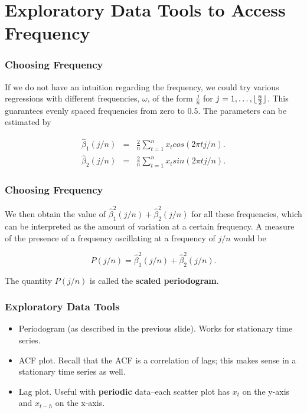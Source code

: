 \documentclass[%
xcolor=pdftex]{beamer}
\DeclarePairedDelimiter\floor{\lfloor}{\rfloor}
\begin{document}
\section{Exploratory Data Tools to Access Frequency}
\frame{\tableofcontents[currentsection]}

\begin{frame}
\frametitle{Choosing Frequency}

If we do not have an intuition regarding the frequency, we could try various regressions with different frequencies, $\omega$, of the form $\frac{j}{n}$ for $j=1,\ldots,\floor{\frac{n}{2}}$.  This guarantees evenly spaced frequencies from zero to 0.5. The parameters can be estimated by

\begin{eqnarray*}
\hat{\beta}_1(j/n) &=& \frac{2}{n} \sum_{t=1}^n x_t cos( 2 \pi t j/n ).\\
\hat{\beta}_2(j/n) &=& \frac{2}{n} \sum_{t=1}^n x_t sin( 2 \pi t j/n  ).
\end{eqnarray*}

\end{frame}

\begin{frame}
\frametitle{Choosing Frequency}

We then obtain the value of $\hat{\beta}_1^2(j/n)+\hat{\beta}_2^2(j/n)$ for all these frequencies, which can be interpreted as the amount of variation at a certain frequency. A measure of the presence of a frequency oscillating at a frequency of $j/n$ would be

\begin{equation*}
P(j/n) = \hat{\beta}^2_1(j/n) + \hat{\beta}^2_2(j/n).
\end{equation*}

The quantity $P(j/n)$ is called the \textbf{scaled periodogram}. 


\vspace{30mm}

\end{frame}

\begin{frame}
\frametitle{Exploratory Data Tools}

\begin{itemize}
\item Periodogram (as described in the previous slide). Works for stationary time series.
\item ACF plot. Recall that the ACF is a correlation of lags; this makes sense in a stationary time series as well.
\item Lag plot. Useful with \textbf{periodic} data--each scatter plot has $x_t$ on the y-axis and $x_{t-h}$ on the x-axis.
\end{itemize}

\end{frame}
\end{document}

